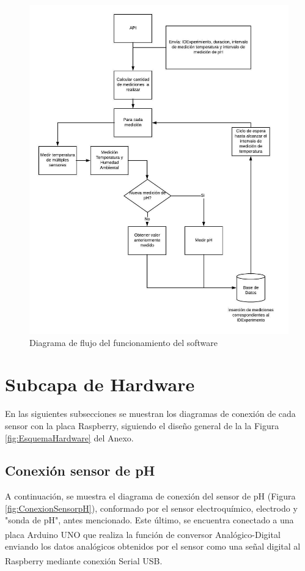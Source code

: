         \begin{figure}[H]
            \centering
            \includegraphics[scale=0.8]{hardware/DiagramadeFlujoPython.jpeg}
            \caption{Diagrama de flujo del funcionamiento del software }
            \label{FlujoPython}
        \end{figure}

\section{Subcapa de Hardware}
    \par En las siguientes subsecciones se muestran los diagramas de conexión de cada sensor con la placa Raspberry, siguiendo el diseño general de la la Figura \ref{fig:EsquemaHardware} del Anexo.

    \subsection{Conexión sensor de pH}
        \par A continuación, se muestra el diagrama de conexión del sensor de pH (Figura \ref{fig:ConexionSensorpH}), conformado por el sensor electroquímico, electrodo y "sonda de pH", antes mencionado. Este último, se encuentra conectado a una placa Arduino\textsuperscript{\textregistered} UNO que realiza la función de conversor Analógico-Digital enviando los datos analógicos obtenidos por el sensor como una señal digital al Raspberry\textsuperscript{\textregistered} mediante conexión Serial USB.
        
